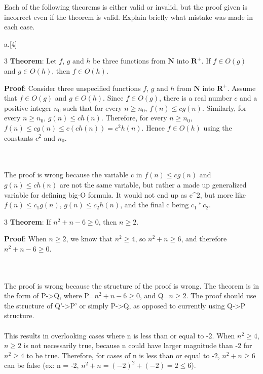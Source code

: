 \item[9] Each of the  following theorems is either valid or invalid,  but the proof given
  is incorrect even if the theorem is valid. Explain briefly what mistake was made in each
  case.
  \begin{question}{a.}[4]
  \item[3] \textbf{Theorem}:  Let $f$, $g$  and $h$  be three functions  from $\mathbf{N}$
    into $\mathbf{R}^+$. If $f \in O(g)$ and $g \in O(h)$, then $f \in O(h)$.

    \noindent\textbf{Proof}: Consider  three unspecified functions  $f$, $g$ and  $h$ from
    $\mathbf{N}$ into $\mathbf{R}^+$. Assume that $f \in  O(g)$ and $g \in O(h)$. Since $f
    \in O(g)$, there is a real number $c$ and a positive integer $n_0$ such that for every
    $n \ge  n_0$, $f(n) \le cg(n)$.  Similarly, for every  $n \ge n_0$, $g(n)  \le ch(n)$.
    Therefore, for every $n  \ge n_0$, $f(n) \le cg(n) \le c(ch(n)) =  c^2 h(n)$. Hence $f
    \in O(h)$ using the constants $c^2$ and $n_0$.
    \begin{Questions}
    \\
    \\{\color{NavyBlue} The proof is wrong because the variable c in $f(n) \le cg(n)$ and $g(n) \le ch(n)$ are not the same variable, but rather a made up generalized variable for defining big-O formula. It would not end up as c^2, but more like $f(n) \le c_1g(n)$, $g(n) \le c_2h(n)$, and the final c being $c_1 * c_2$.}
    \\ 
      \vfill
    \end{Questions}

  \item[3] \textbf{Theorem}: If $n^2 + n - 6 \ge 0$, then $n \ge 2$.

    \noindent\textbf{Proof}: When $n \ge 2$, we know that $n^2 \ge 4$, so $n^2 + n \ge 6$,
    and therefore $n^2 + n - 6 \ge 0$.
    \begin{Questions}
    \\
    \\{\color{NavyBlue}The proof is wrong because the structure of the proof is wrong. The theorem is in the form of P->Q, where P=$n^2 + n - 6 \ge 0$, and Q=$n \ge 2$. The proof should use the structure of Q'->P' or simply P->Q, as opposed to currently using Q->P structure.
    \\
    \\This results in overlooking cases where n is less than or equal to -2. When $n^2 \ge 4$, $n \ge 2$ is not necessarily true, because n could have larger magnitude than -2 for $n^2 \ge 4$ to be true. Therefore, for cases of n is less than or equal to -2, $n^2 + n \ge 6$ can be false (ex: n = -2, $n^2 + n = (-2)^2 + (-2) = 2 \le 6$).}
      \vfill 
      

\end{Questions}
\end{question}
